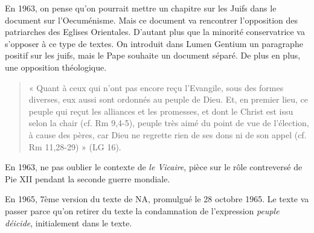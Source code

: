     En 1963, on pense qu'on pourrait mettre un chapitre sur les Juifs dans le document sur l'Oecuménisme. Mais ce document va rencontrer l'opposition des patriarches des Eglises Orientales. D'autant plus que la minorité conservatrice va s'opposer à ce type de textes.
    On introduit dans Lumen Gentium un paragraphe positif sur les juifs, mais le Pape souhaite un document séparé. De plus en plus, une opposition théologique.
    
    \begin{quote}
    «  Quant  à  ceux  qui  n’ont  pas  encore  reçu  l’Evangile,  sous  des  formes  diverses,  eux  aussi  sont ordonnés  au  peuple  de  Dieu.  Et,  en  premier  lieu,  ce  peuple  qui  reçut  les  alliances  et  les promesses,  et  dont  le  Christ  est  issu  selon  la  chair  (cf.  Rm  9,4-5),  peuple  très  aimé  du  point  de vue  de  l’élection,  à  cause  des  pères,  car  Dieu  ne  regrette  rien  de  ses  dons  ni  de  son  appel  (cf. Rm 11,28-29)  »  (LG  16). 
    \end{quote}
    
    En 1963, ne pas oublier le contexte de \textit{le Vicaire}, pièce sur le rôle contreversé de Pie XII pendant la seconde guerre mondiale.
    
    En 1965, 7ème version du texte de NA, promulgué le 28 octobre 1965. Le texte va passer parce qu'on retirer du texte la condamnation de l'expression \textit{peuple déicide}, initialement dans le texte. 
    
  
    
